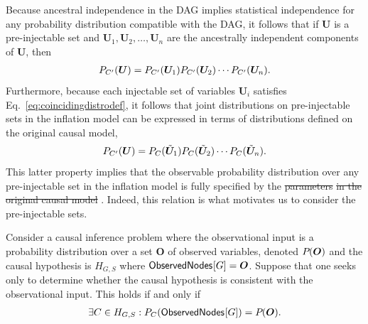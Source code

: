 Because ancestral independence in the DAG implies statistical independence for any probability distribution compatible with the DAG, it follows that  if 
$\bm{U}$ is a pre-injectable set and $\bm{U}_1,\bm{U}_2,\ldots,\bm{U}_n$ are the ancestrally independent components of $\bm{U}$, then 
\begin{align}%
\pdf[C']{\bm{U}} = \pdf[C']{\bm{U}_1} \pdf[C']{\bm{U}_2}  \cdots \pdf[C']{\bm{U}_n}.
\end{align}
Furthermore, because each injectable set of variables $\bm{U}_i$ satisfies Eq.~\eqref{eq:coincidingdistrodef}, it follows that joint distributions on pre-injectable sets in the inflation model can be expressed in terms of distributions defined on the original causal model,
\begin{align}\label{eq:preinjfactor}
\pdf[C']{\bm{U}} = \pdf[C]{\subsim{\bm{U}}_1} \pdf[C]{\subsim{\bm{U}}_2}  \cdots \pdf[C]{\subsim{\bm{U}}_n}.
\end{align}
This latter property implies that the observable probability distribution over any pre-injectable set in the inflation model is fully specified by the \sout{parameters}  \sout{in the original causal model} .  Indeed, this relation is what motivates us to consider the pre-injectable sets.

Consider a causal inference problem where the observational input is a probability distribution over a set $\bm{O}$ of observed variables, denoted $\pdf{\bm{O}}$ and the causal hypothesis is $H_{G,S}$ where $\SmallNamedFunction{ObservedNodes}{G}=\bm{O}$.  Suppose that one seeks only to determine whether the causal hypothesis is consistent with the observational input.  
This holds if and only if
\begin{align}
\exists C \in H_{G,S} : \pdf[C]{\SmallNamedFunction{ObservedNodes}{G}}= \pdf{\bm{O}}.
\end{align}




